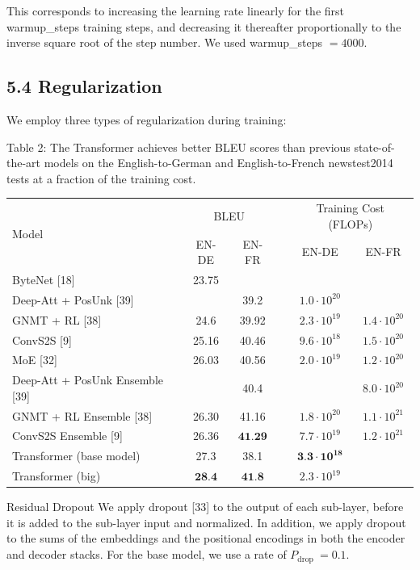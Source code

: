 \documentclass[10pt]{article}
\begin{document}
This corresponds to increasing the learning rate linearly for the first warmup\_steps training steps, and decreasing it thereafter proportionally to the inverse square root of the step number. We used warmup\_steps $=4000$.

\subsection*{5.4 Regularization}
We employ three types of regularization during training:

Table 2: The Transformer achieves better BLEU scores than previous state-of-the-art models on the English-to-German and English-to-French newstest2014 tests at a fraction of the training cost.

\begin{center}
\begin{tabular}{lcclcc}
\hline
\multirow{2}{*}{Model} & \multicolumn{2}{c}{BLEU} &  & \multicolumn{2}{c}{Training Cost (FLOPs)} \\
\cline { 2 - 3 }\cline { 6 - 7 }
 & EN-DE & EN-FR &  & EN-DE & EN-FR \\
\hline
ByteNet [18] & 23.75 &  &  &  &  \\
Deep-Att + PosUnk [39] &  & 39.2 &  & $1.0 \cdot 10^{20}$ &  \\
GNMT + RL [38] & 24.6 & 39.92 &  & $2.3 \cdot 10^{19}$ & $1.4 \cdot 10^{20}$ \\
ConvS2S [9] & 25.16 & 40.46 &  & $9.6 \cdot 10^{18}$ & $1.5 \cdot 10^{20}$ \\
MoE [32] & 26.03 & 40.56 &  & $2.0 \cdot 10^{19}$ & $1.2 \cdot 10^{20}$ \\
\hline
Deep-Att + PosUnk Ensemble [39] &  & 40.4 &  &  & $8.0 \cdot 10^{20}$ \\
GNMT + RL Ensemble [38] & 26.30 & 41.16 &  & $1.8 \cdot 10^{20}$ & $1.1 \cdot 10^{21}$ \\
ConvS2S Ensemble [9] & 26.36 & $\mathbf{4 1 . 2 9}$ &  & $7.7 \cdot 10^{19}$ & $1.2 \cdot 10^{21}$ \\
\hline
Transformer (base model) & 27.3 & 38.1 &  & $\mathbf{3 . 3} \cdot \mathbf{1 0}^{\mathbf{1 8}}$ &  \\
Transformer (big) & $\mathbf{2 8 . 4}$ & $\mathbf{4 1 . 8}$ &  & $2.3 \cdot 10^{19}$ &  \\
\hline
\end{tabular}
\end{center}

Residual Dropout We apply dropout [33] to the output of each sub-layer, before it is added to the sub-layer input and normalized. In addition, we apply dropout to the sums of the embeddings and the positional encodings in both the encoder and decoder stacks. For the base model, we use a rate of $P_{\text {drop }}=0.1$.
\end{document}
